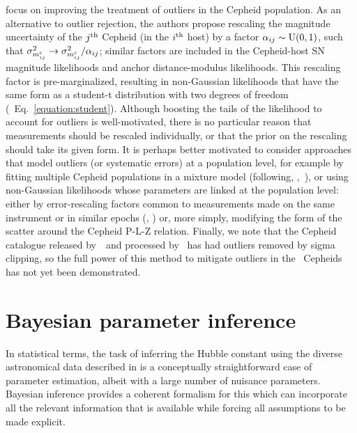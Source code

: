 \documentclass[a4paper,fleqn,usenatbib]{mnras}
\newcommand{\riess}{\citetalias{Riess_etal:2016}}
\newcommand{\mc}{\ensuremath{m_{ij}^{\rm c}}}
\begin{document}
{\citet{Cardona_etal:2016} focus on improving the treatment of outliers in the Cepheid population. As an alternative to outlier rejection, the authors propose rescaling the magnitude uncertainty of the $j^{\rm th}$ Cepheid (in the $i^{\rm th}$ host) by a factor $\alpha_{ij} \sim {\rm U}(0, 1)$, such that $\sigma_{\mc}^2 \rightarrow \sigma_{\mc}^2 / \alpha_{ij}$; similar factors are included in the Cepheid-host SN magnitude likelihoods and anchor distance-modulus likelihoods. This rescaling factor is pre-marginalized, resulting in non-Gaussian likelihoods that have the same form as a student-t distribution with two degrees of freedom (\cf\ Eq.~\ref{equation:student}). Although boosting the tails of the likelihood to account for outliers is well-motivated, there is no particular reason that measurements should be rescaled individually, or that the prior on the rescaling should take its given form. It is perhaps better motivated to consider approaches that model outliers (or systematic errors) at a population level, for example by fitting multiple Cepheid populations in a mixture model (following, \eg,~\citealt{Hogg_etal:2010}), or using non-Gaussian likelihoods whose parameters are linked at the population level: either by error-rescaling factors common to measurements made on the same instrument or in similar epochs (\eg, \citealt{Lahav_etal:2000}) or, more simply, modifying the form of the scatter around the Cepheid P-L-Z relation. Finally, we note that the Cepheid catalogue released by~\riess\ and processed by~\citet{Cardona_etal:2016} has had outliers removed by sigma clipping, so the full power of this method to mitigate outliers in the \riess\ Cepheids has not yet been demonstrated.


\section{Bayesian parameter inference}
\label{section:model}

In statistical terms, the task of
inferring the Hubble constant
using the diverse astronomical data described in 
is a conceptually straightforward case of parameter
estimation, albeit with 
a large number of nuisance parameters.
Bayesian inference provides a coherent formalism for 
this which can
incorporate all the relevant information that is available
while forcing all assumptions to be made explicit.

}
\end{document}
